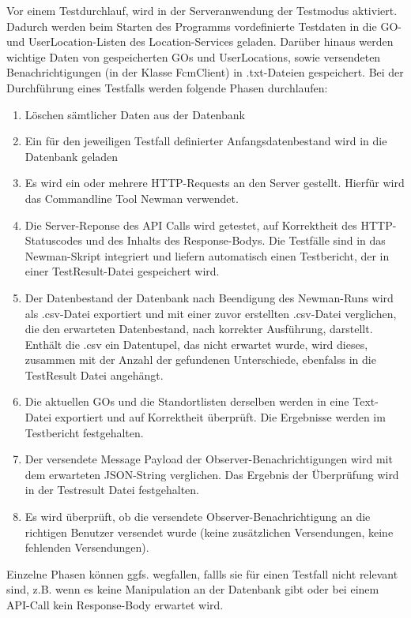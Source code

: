 \documentclass[11pt,a4paper]{scrartcl}
\begin{document}
Vor einem Testdurchlauf, wird in der Serveranwendung der Testmodus aktiviert. Dadurch werden beim Starten des Programms vordefinierte Testdaten in die GO- und UserLocation-Listen des Location-Services geladen. Darüber hinaus werden wichtige Daten von gespeicherten GOs und UserLocations, sowie versendeten Benachrichtigungen (in der Klasse FcmClient) in .txt-Dateien gespeichert.
Bei der Durchführung eines Testfalls werden folgende Phasen durchlaufen:

\begin{enumerate}
	\item Löschen sämtlicher Daten aus der Datenbank
	\item Ein für den jeweiligen Testfall definierter Anfangsdatenbestand wird in die Datenbank geladen
	\item Es wird ein oder mehrere HTTP-Requests an den Server gestellt. Hierfür wird das Commandline Tool Newman verwendet.
	\item Die Server-Reponse des API Calls wird getestet, auf Korrektheit des HTTP-Statuscodes und des Inhalts des Response-Bodys. Die Testfälle sind in das Newman-Skript integriert und liefern automatisch einen Testbericht, der in einer TestResult-Datei gespeichert wird.
	\item Der Datenbestand der Datenbank nach Beendigung des Newman-Runs wird als .csv-Datei exportiert und mit einer zuvor erstellten .csv-Datei verglichen, die den erwarteten Datenbestand, nach korrekter Ausführung, darstellt. Enthält die .csv ein Datentupel, das nicht erwartet wurde,  wird dieses, zusammen mit der Anzahl der gefundenen Unterschiede, ebenfalss in die TestResult Datei angehängt.
	\item Die aktuellen GOs und die Standortlisten derselben werden in eine Text-Datei exportiert und auf Korrektheit überprüft. Die Ergebnisse werden im Testbericht festgehalten.
	\item Der versendete Message Payload der Observer-Benachrichtigungen wird mit dem erwarteten JSON-String verglichen. Das Ergebnis der Überprüfung wird in der Testresult Datei festgehalten.
	\item Es wird überprüft, ob die versendete Observer-Benachrichtigung an die richtigen Benutzer versendet wurde (keine zusätzlichen Versendungen, keine fehlenden Versendungen).
\end{enumerate}
Einzelne Phasen können ggfs. wegfallen, fallls sie für einen Testfall nicht relevant sind, z.B. wenn es keine Manipulation an der Datenbank gibt oder bei einem API-Call kein Response-Body erwartet wird.\\
\end{document}
